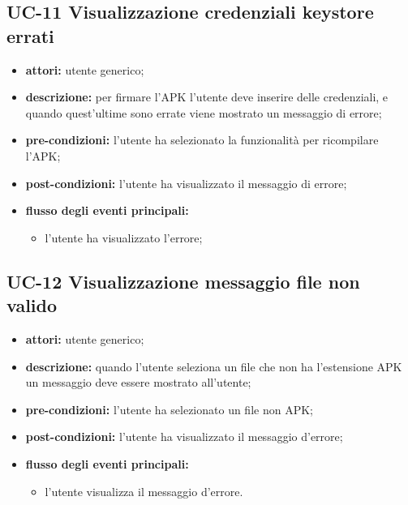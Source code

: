 \subsection*{UC-11 Visualizzazione credenziali keystore errati}\label{subsec:uc-11-visualizzazione-credenziali-keystore-errati}
\begin{itemize}
    \item \textbf{attori:} utente generico;
    \item \textbf{descrizione:} per firmare l'APK l'utente deve inserire delle credenziali, e quando quest'ultime sono errate viene mostrato un messaggio di errore;
    \item \textbf{pre-condizioni:} l'utente ha selezionato la funzionalità per ricompilare l'APK;
    \item \textbf{post-condizioni:} l'utente ha visualizzato il messaggio di errore;
    \item \textbf{flusso degli eventi principali:}
    \begin{itemize}
        \item l'utente ha visualizzato l'errore;
    \end{itemize}
\end{itemize}

\subsection*{UC-12 Visualizzazione messaggio file non valido}\label{subsec:uc-12-visualizzazione-messaggio-file-non-valido}
\begin{itemize}
    \item \textbf{attori:} utente generico;
    \item \textbf{descrizione:} quando l'utente seleziona un file che non ha l'estensione APK un messaggio deve essere mostrato all'utente;
    \item \textbf{pre-condizioni:} l'utente ha selezionato un file non APK;
    \item \textbf{post-condizioni:} l'utente ha visualizzato il messaggio d'errore;
    \item \textbf{flusso degli eventi principali:}
    \begin{itemize}
        \item l'utente visualizza il messaggio d'errore.
    \end{itemize}
\end{itemize}
